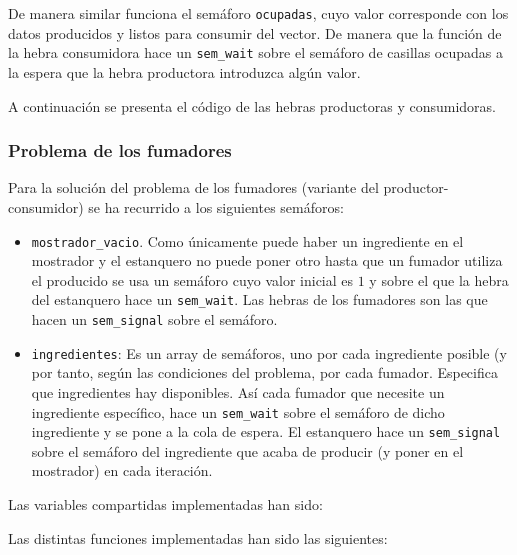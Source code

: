 \documentclass[12pt,a4paper]{article}
\def\code#1{\texttt{#1}}
\begin{document}
De manera similar funciona el semáforo \code{ocupadas}, cuyo valor corresponde con los datos producidos y listos para consumir del vector. De manera que la función de la hebra consumidora hace un \code{sem\_wait} sobre el semáforo de casillas ocupadas a la espera que la hebra productora introduzca algún valor.

A continuación se presenta el código de las hebras productoras y consumidoras.







\subsubsection{Problema de los fumadores}

Para la solución del problema de los fumadores (variante del productor-consumidor) se ha recurrido a los siguientes semáforos:
\begin{itemize}
	\item \code{mostrador\_vacio}. Como únicamente puede haber un ingrediente en el mostrador y el estanquero no puede poner otro hasta que un fumador utiliza el producido se usa un semáforo cuyo valor inicial es $1$ y sobre el que la hebra del estanquero hace un \code{sem\_wait}. Las hebras de los fumadores son las que hacen un \code{sem\_signal} sobre el semáforo.
	\item \code{ingredientes}: Es un array de semáforos, uno por cada ingrediente posible (y por tanto, según las condiciones del problema, por cada fumador. Especifica que ingredientes hay disponibles. Así cada fumador que necesite un ingrediente específico, hace un \code{sem\_wait} sobre el semáforo de dicho ingrediente y se pone a la cola de espera. El estanquero hace un \code{sem\_signal} sobre el semáforo del ingrediente que acaba de producir (y poner en el mostrador) en cada iteración.
	
\end{itemize}
Las variables compartidas implementadas han sido:



Las distintas funciones implementadas han sido las siguientes:
\end{document}
